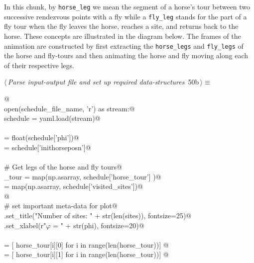 \documentclass[11.5pt]{report}
\begin{document}
\vspace{-0.8cm} \newchunk In this chunk, by \verb|horse_leg| we mean the segment of a horse's 
tour between two successive rendezvous points with a fly while a \verb|fly_leg| stands for 
the part of a fly tour when the fly leaves the horse, reaches a site, and returns back to the horse. These
concepts are illustrated in the diagram below. The frames of the animation are constructed by first
extracting the \verb|horse_legs| and \verb|fly_legs| of the horse and fly-tours and then 
animating the horse and fly moving along each of their respective legs. 


\begin{flushleft} \small\label{scrap73}\raggedright\small
{} $\langle\,${\itshape Parse input-output file and set up required data-structures}\nobreak\ {\footnotesize {50b}}$\,\rangle\equiv$
\vspace{-1ex}
\begin{list}{}{} \item
\mbox{}\verb@   @\\
\mbox{}\verb@with open(schedule_file_name, 'r') as stream:@\\
\mbox{}\verb@      schedule = yaml.load(stream)@\\
\mbox{}\verb@@\\
\mbox{}\verb@phi           = float(schedule['phi'])@\\
\mbox{}\verb@inithorseposn = schedule['inithorseposn']@\\
\mbox{}\verb@@\\
\mbox{}\verb@# Get legs of the horse and fly tours@\\
\mbox{}\verb@horse_tour  = map(np.asarray, schedule['horse_tour']   )@\\
\mbox{}\verb@sites       = map(np.asarray, schedule['visited_sites'])@\\
\mbox{}\verb@           @\\
\mbox{}\verb@# set important meta-data for plot@\\
\mbox{}\verb@ax.set_title("Number of sites: " + str(len(sites)), fontsize=25)@\\
\mbox{}\verb@ax.set_xlabel(r"$\varphi$ = " + str(phi), fontsize=20)@\\
\mbox{}\verb@@\\
\mbox{}\verb@xhs = [ horse_tour[i][0] for i in range(len(horse_tour))]    @\\
\mbox{}\verb@yhs = [ horse_tour[i][1] for i in range(len(horse_tour))]    @\\

\end{list}
\end{flushleft}
\end{document}
